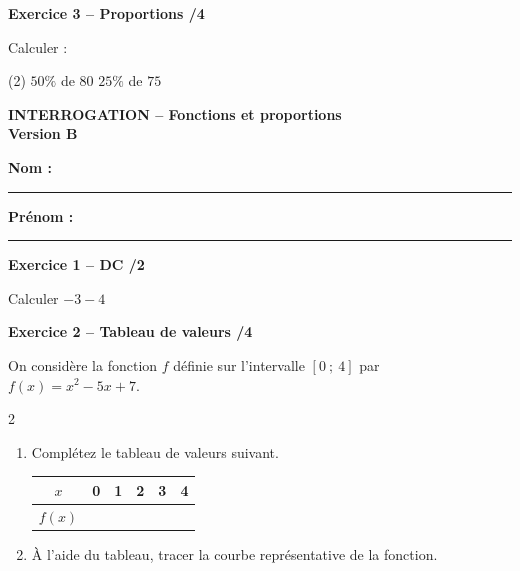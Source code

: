 \documentclass[10pt,a4paper]{article}
\newcommand{\version}[1]{
    \begin{center}
        \textbf{\large INTERROGATION -- Fonctions et proportions}\\
        \textbf{Version #1}
    \end{center}

    \vspace{-0.1cm}

    \textbf{Nom :} \rule{5cm}{0.4pt}
    \hfill
    \textbf{Prénom :} \rule{4cm}{0.4pt}

    \vspace{0.2cm}
}
\begin{document}
\textbf{Exercice 3 -- Proportions \hfill /4}

Calculer :\begin{tasks}(2)
\task $50\%$ de $80$
\task $25\%$ de $75$
\end{tasks}

\vfill


\version{B}
\textbf{Exercice 1 -- DC \hfill /2}

Calculer $-3-4$

\vspace{0.1cm}

\textbf{Exercice 2 -- Tableau de valeurs \hfill /4}

On considère la fonction \(f\) définie sur l'intervalle \([0\ ;\ 4]\) par \(f(x)=x^2-5x+7\). 


\begin{multicols}{2}
    \begin{minipage}{0.45\textwidth}
    \begin{enumerate}
    \item Complétez le tableau de valeurs suivant.
    
    \begin{center}
        \renewcommand{\arraystretch}{1.5} %
        \setlength{\tabcolsep}{0.3cm} %
        \begin{tabular}{|*{6}{c|}}
        \hline
        \(x\) & 0 & 1 & 2 & 3 & 4  \\
        \hline
        \(f(x)\) &  &  &  &  &  \\
        \hline
        \end{tabular}
    \end{center}

    \vfill\null
    
    \item À l'aide du tableau, tracer la courbe représentative de la fonction.
    \end{enumerate}
    \end{minipage}

        \hspace{-1cm}

\end{multicols}
\end{document}
